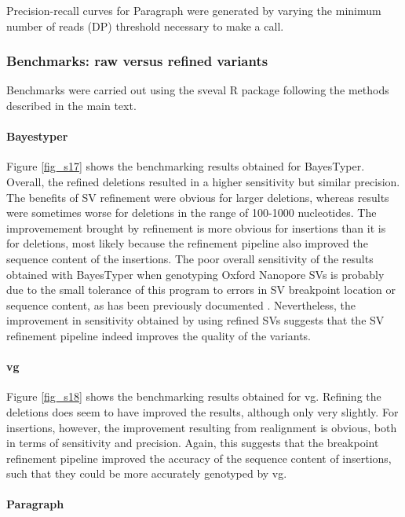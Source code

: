 \documentclass[12pt]{article}
\begin{document}
Precision-recall curves for Paragraph were generated by varying the minimum number of reads (DP) threshold necessary to make a call.

\subsubsection{Benchmarks: raw versus refined variants}

Benchmarks were carried out using the sveval R package \citep[][\url{https://github.com/jmonlong/sveval}]{vg} following the methods described in the main text.

\paragraph{Bayestyper}

Figure \ref{fig_s17} shows the benchmarking results obtained for BayesTyper.
Overall, the refined deletions resulted in a higher sensitivity but similar precision. 
The benefits of SV refinement were obvious for larger deletions, whereas results were sometimes worse for deletions in the range of 100-1000 nucleotides.
The improvemement brought by refinement is more obvious for insertions than it is for deletions, most likely because the refinement pipeline also improved the sequence content of the insertions.
The poor overall sensitivity of the results obtained with BayesTyper when genotyping Oxford Nanopore SVs is probably due to the small tolerance of this program to errors in SV breakpoint location or sequence content, as has been previously documented \citep{vg}.
Nevertheless, the improvement in sensitivity obtained by using refined SVs suggests that the SV refinement pipeline indeed improves the quality of the variants.

\paragraph{vg}

Figure \ref{fig_s18} shows the benchmarking results obtained for vg.
Refining the deletions does seem to have improved the results, although only very slightly.
For insertions, however, the improvement resulting from realignment is obvious, both in terms of sensitivity and precision.
Again, this suggests that the breakpoint refinement pipeline improved the accuracy of the sequence content of insertions, such that they could be more accurately genotyped by vg.

\paragraph{Paragraph}
\end{document}
